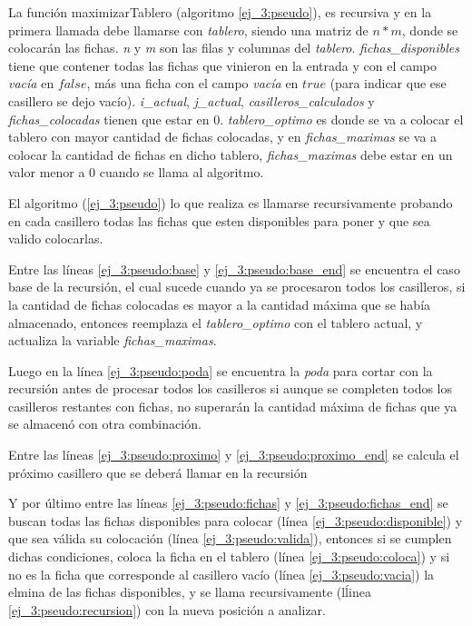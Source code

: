 

La funci\'on maximizarTablero (algoritmo \ref{ej_3:pseudo}), es recursiva y en la primera llamada debe llamarse con \emph{tablero}, siendo una matriz de $n * m$, donde se colocar\'an las fichas.
\emph{n} y \emph{m} son las filas y columnas del \emph{tablero}.
\emph{fichas\_disponibles} tiene que contener todas las fichas que vinieron en la entrada y con el campo \emph{vac\'ia} en $false$, m\'as una ficha con el campo \emph{vac\'ia} en $true$ (para indicar que ese casillero se dejo vac\'io).
\emph{i\_actual}, \emph{j\_actual}, \emph{casilleros\_calculados} y \emph{fichas\_colocadas} tienen que estar en $0$.
\emph{tablero\_optimo} es donde se va a colocar el tablero con mayor cantidad de fichas colocadas, y en \emph{fichas\_maximas} se va a colocar la cantidad de fichas en dicho tablero, \emph{fichas\_maximas} debe estar en un valor menor a 0 cuando se llama al algoritmo.

El algoritmo (\ref{ej_3:pseudo}) lo que realiza es llamarse recursivamente probando en cada casillero todas las fichas que esten disponibles para poner y que sea valido colocarlas.

Entre las l\'ineas \ref{ej_3:pseudo:base} y \ref{ej_3:pseudo:base_end} se encuentra el caso base de la recursi\'on, el cual sucede cuando ya se procesaron todos los casilleros, si la cantidad de fichas colocadas es mayor a la cantidad m\'axima que se hab\'ia almacenado, entonces reemplaza el \emph{tablero\_optimo} con el tablero actual, y actualiza la variable \emph{fichas\_maximas}.

Luego en la l\'inea \ref{ej_3:pseudo:poda} se encuentra la \emph{poda} para cortar con la recursi\'on antes de procesar todos los casilleros si aunque se completen todos los casilleros restantes con fichas, no superar\'an la cantidad m\'axima de fichas que ya se almacen\'o con otra combinaci\'on.

Entre las l\'ineas \ref{ej_3:pseudo:proximo} y \ref{ej_3:pseudo:proximo_end} se calcula el pr\'oximo casillero que se deber\'a llamar en la recursi\'on

Y por \'ultimo entre las l\'ineas \ref{ej_3:pseudo:fichas} y \ref{ej_3:pseudo:fichas_end} se buscan todas las fichas disponibles para colocar (l\'inea \ref{ej_3:pseudo:disponible}) y que sea v\'alida su colocaci\'on (l\'inea \ref{ej_3:pseudo:valida}), entonces si se cumplen dichas condiciones,
coloca la ficha en el tablero (l\'inea \ref{ej_3:pseudo:coloca}) y si no es la ficha que corresponde al casillero vac\'io (l\'inea \ref{ej_3:pseudo:vacia}) la elmina de las fichas disponibles,
y se llama recursivamente (l\'linea \ref{ej_3:pseudo:recursion}) con la nueva posici\'on a analizar.

